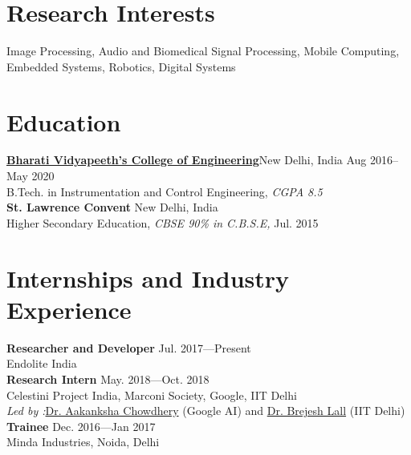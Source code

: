 \section{Research Interests}
Image Processing, Audio and Biomedical Signal Processing, Mobile Computing, Embedded Systems, Robotics, Digital Systems

\section{Education}
\href{http://bvcoend.ac.in}{\textbf{Bharati Vidyapeeth’s College of Engineering}}\newline New Delhi, India \hfill{Aug  2016--May 2020}\\
B.Tech. in Instrumentation and Control Engineering, \emph{CGPA 8.5}\\
\textbf{St. Lawrence Convent}
New Delhi, India \\
Higher Secondary Education, \emph{CBSE 90\% in C.B.S.E, }\hfill{Jul. 2015}\\



\section{Internships \newline and Industry Experience}

\textbf{Researcher and Developer} \hfill {Jul. 2017---Present}\\
Endolite India\\
\textbf{Research Intern} \hfill {May. 2018---Oct. 2018}\\
Celestini Project India, Marconi Society, Google, IIT Delhi\\
\emph{Led by :}\href{http://www.achowdhery.com/}{Dr. Aakanksha Chowdhery} (Google AI) and \href{http://ee.iitd.ernet.in/people/brijeshlall.html}{Dr. Brejesh Lall} (IIT Delhi)\\
\textbf{Trainee} \hfill {Dec. 2016---Jan 2017}\\
Minda Industries, Noida, Delhi\\

